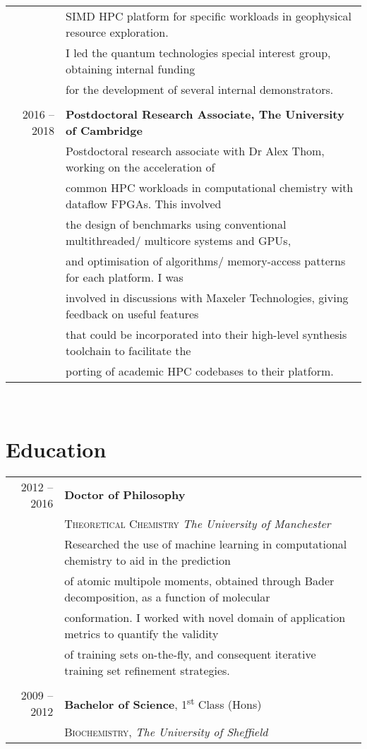 \documentclass[11pt]{article} %
\begin{document}
\begin{tabular}{rl}
&SIMD HPC platform for specific workloads in geophysical resource exploration.\\
&I led the quantum technologies special interest group, obtaining internal funding\\
&for the development of several internal demonstrators.\\ 
&\\
2016 -- 2018 & \textbf{Postdoctoral Research Associate, The University of Cambridge}\\
& Postdoctoral research associate with Dr Alex Thom, working on the acceleration of\\ 
&common HPC workloads in computational chemistry with dataflow FPGAs. This involved\\ 
&the design of benchmarks using conventional multithreaded/ multicore systems and GPUs,\\ 
&and optimisation of algorithms/ memory-access patterns for each platform. I was\\ 
&involved in discussions with Maxeler Technologies, giving feedback on useful features\\ 
&that could be incorporated into their high-level synthesis toolchain to facilitate the\\ 
&porting of academic HPC codebases to their platform.\\
\end{tabular}
\\

\section{Education} 

\begin{tabular}{rl} %

2012 -- 2016 & \textbf{Doctor of Philosophy} \\ 
& \textsc{Theoretical Chemistry} \textit{The University of Manchester}\\
&Researched the use of machine learning in computational chemistry to aid in the prediction\\ 
&of atomic multipole moments, obtained through Bader decomposition, as a function of molecular\\
&conformation. I worked with novel domain of application metrics to quantify the validity\\
&of training sets on-the-fly, and consequent iterative training set refinement strategies.\\
&\\

2009 -- 2012 & \textbf{Bachelor of Science}, 1\textsuperscript{st} Class (Hons)\\ 
& \textsc{Biochemistry}, \textit{The University of Sheffield}\\

\end{tabular}\\[10pt]
\end{document}
